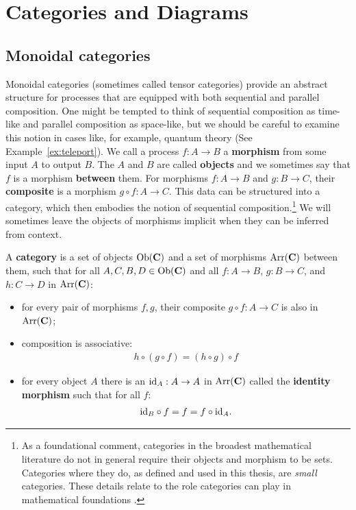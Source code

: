 \chapter{Categories and Diagrams}
\label{chap:cats}

\section{Monoidal categories}
Monoidal categories (sometimes called tensor categories) provide an abstract structure for processes that are equipped with both sequential and parallel composition. One might be tempted to think of sequential composition as time-like and parallel composition as space-like, but we should be careful to examine this notion in cases like, for example, quantum theory (See Example~\ref{ex:teleport}).  We call a process $f:A\to B$ a \textbf{morphism} from some input $A$ to output $B$. The $A$ and $B$ are called \textbf{objects} and we sometimes say that $f$ is a morphism \textbf{between} them. For morphisms $f:A\to B$ and $g:B\to C$, their \textbf{composite} is a morphism $g\circ f:A\to C$. This data can be structured into a category, which then embodies the notion of sequential composition.\footnote{As a foundational comment, categories in the broadest mathematical literature do not in general require their objects and morphism to be sets. Categories where they do, as defined and used in this thesis, are \emph{small} categories. These details relate to the role categories can play in mathematical foundations \cite{mac1969one}.} We will sometimes leave the objects of morphisms implicit when they can be inferred from context.

\begin{defn}
A \textbf{category}  is a set of objects $\mbox{Ob}(\mathbf{C})$ and a set of morphisms $\mbox{Arr}(\mathbf{C})$ between them, such that for all $A,C,B,D\in \mbox{Ob}(\mathbf{C})$ and all $f:A\to B$, $g:B\to C$, and $h:C\to D$ in $\mbox{Arr}(\mathbf{C})$:
\begin{itemize}
\item for every pair of morphisms $f,g$, their composite $g\circ f:A\to C$ is also in $\mbox{Arr}(\mathbf{C})$;
\item composition is associative:
\begin{align}
h\circ(g\circ f) = (h\circ g)\circ f
\end{align}
\item for every object $A$ there is an $\mbox{id}_{A}:A\to A$ in $\mbox{Arr}(\mathbf{C})$ called the \textbf{identity morphism} such that for all $f$:
\begin{align}
\mbox{id}_{B}\circ f = f = f\circ\mbox{id}_{A}.
\end{align}
\end{itemize}
\end{defn}

